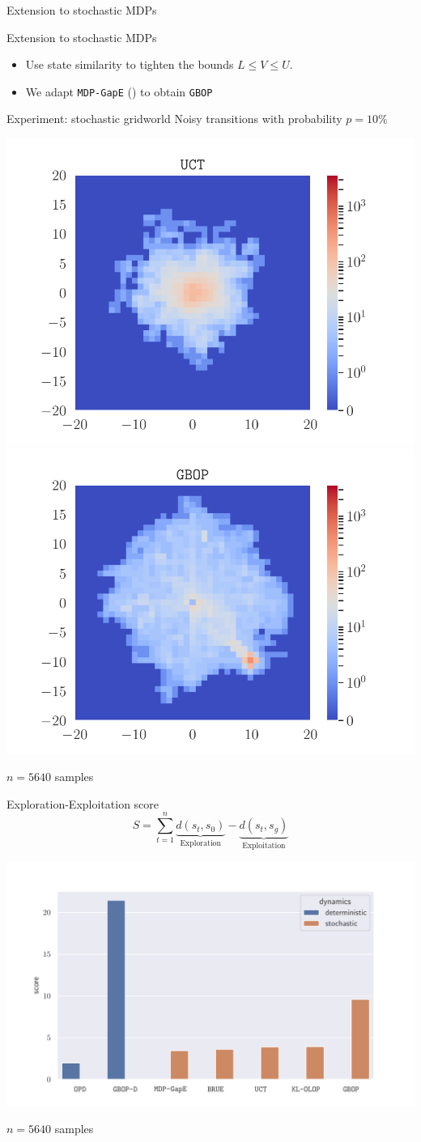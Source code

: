 \documentclass[slideopt,A4,showboxes,svgnames]{beamer}
\begin{document}
\begin{frame}{Extension to stochastic MDPs}
\begin{exampleblock}{Extension to stochastic MDPs}
\begin{itemize}
	\item Use state similarity to \alert{tighten} the bounds $L\leq V\leq U$.
	\item We adapt \texttt{MDP-GapE} (\cite{Jonsson2020planning}) to obtain \texttt{GBOP}
\end{itemize}
\end{exampleblock}
\end{frame}


\begin{frame}{Experiment: stochastic gridworld}
Noisy transitions with probability $p=10\%$
\begin{center}
	\includegraphics[trim={1.8cm 0.4cm 1.8cm 0.7cm}, clip, width=0.43\linewidth]{../img/occupations_UCT.pdf}
	\includegraphics[trim={1.8cm 0.4cm 1.8cm 0.7cm}, clip, width=0.43\linewidth]{../img/occupations_GBOP.pdf}
	
	$n = 5640$ samples
\end{center}
\end{frame}

\begin{frame}{Exploration-Exploitation score}
$$S = \sum_{t=1}^n \underbrace{d(s_t, s_0)}_{\text{Exploration}} - \underbrace{d(s_t, s_g)}_{\text{Exploitation}}$$
\begin{center}
	\includegraphics[trim = {1.4cm 0.cm 2cm 1.5cm}, clip, width=0.7\linewidth]{../img/score.pdf}

	$n = 5640$ samples
\end{center}
\end{frame}
\end{document}
